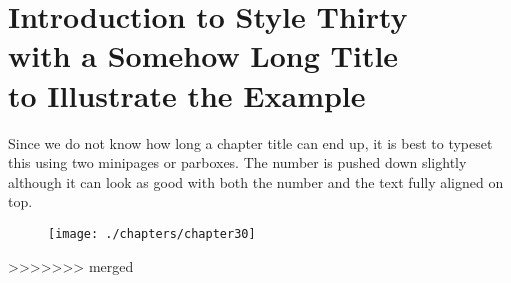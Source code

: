 \chapter{Introduction to Style Thirty\\ with a Somehow Long Title \\to Illustrate the Example}

Since we do not know how long a chapter title can end up, it is best to
typeset this using two minipages or parboxes. The number is pushed down slightly although it can look as good with both the number and the text fully aligned on top.
\medskip
\begin{figure}[ht]
\centering
\texttt{[image: ./chapters/chapter30]}
\end{figure}
>>>>>>> merged
